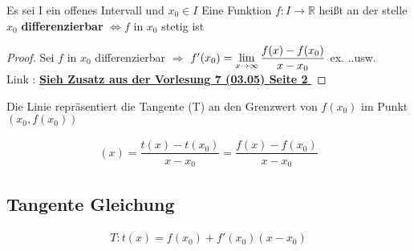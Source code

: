 \begin{theorem}[Differenzeierbarkit]
Es sei I ein offenes Intervall und $x_0 \in I $ Eine Funktion $f : I \rightarrow \mathbb{R}$ heißt an der stelle $x_0$ \textbf{ differenzierbar} $\Leftrightarrow  f$ in $x_0$ stetig ist
\end{theorem}
\begin{proof}
Sei $f$ in $x_0$ differenzierbar $\Rightarrow$ $f'(x_0) = \lim\limits_{x \to \infty} \dfrac{f(x) - f(x_0)}{ x - x_0 }$ ex. ..usw.\\
Link : \href{https://tu-dresden.de/mn/math/algebra/das-institut/beschaeftigte/antje-noack/ressourcen/dateien/v120-1/MathMethInf07Zusatz.pdf?lang=en}
{\textbf{Sieh Zusatz aus der Vorlesung 7 (03.05) Seite 2} }
\end{proof}
\begin{center}
\end{center}
Die Linie repräsentiert die Tangente (T) an den Grenzwert von $f(x_0)$ im Punkt $(x_0 , f(x_0))$

\begin{gather*}
(x) = \dfrac{t(x)-t(x_0)}{x - x_0} = \dfrac{f(x)-f(x_0)}{x - x_0}
\end{gather*}

\subsection{Tangente Gleichung}
\begin{align*}
T : t(x) = f(x_0) + f'(x_0)(x-x_0)
\end{align*}

